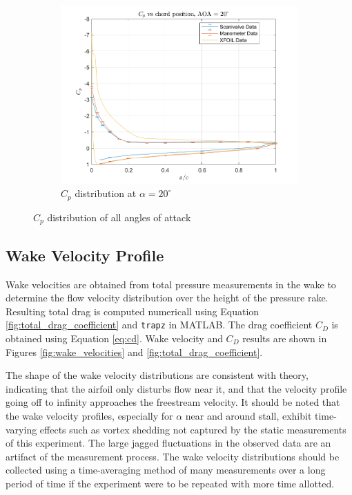 \documentclass[runningheads]{llncs}
\begin{document}
\begin{figure}[h]
\begin{subfigure}[b]{0.3\textwidth}
        \includegraphics[width=\textwidth]{figures/AOA20.png}
        \caption{$C_p$ distribution at $\alpha = 20^\circ$}
        \label{fig:cp_20}
    \end{subfigure}
    \caption{$C_p$ distribution of all angles of attack}
    \label{fig:cp}
\end{figure}


\subsection{Wake Velocity Profile}

\noindent
Wake velocities are obtained from total pressure measurements in the wake to determine the flow velocity distribution over the height of the pressure rake. Resulting total drag is computed numericall using Equation \ref{fig:total_drag_coefficient} and \verb|trapz| in MATLAB. The drag coefficient $C_D$ is obtained using Equation \ref{eq:cd}. Wake velocity and $C_D$ results are shown in Figures \ref{fig:wake_velocities} and \ref{fig:total_drag_coefficient}.\newline

\noindent
The shape of the wake velocity distributions are consistent with theory, indicating that the airfoil only disturbs flow near it, and that the velocity profile going off to infinity approaches the freestream velocity. It should be noted that the wake velocity profiles, especially for $\alpha$ near and around stall, exhibit time-varying effects such as vortex shedding not captured by the static measurements of this experiment. The large jagged fluctuations in the observed data are an artifact of the measurement process. The wake velocity distributions should be collected using a time-averaging method of many measurements over a long period of time if the experiment were to be repeated with more time allotted.\newline
\end{document}
